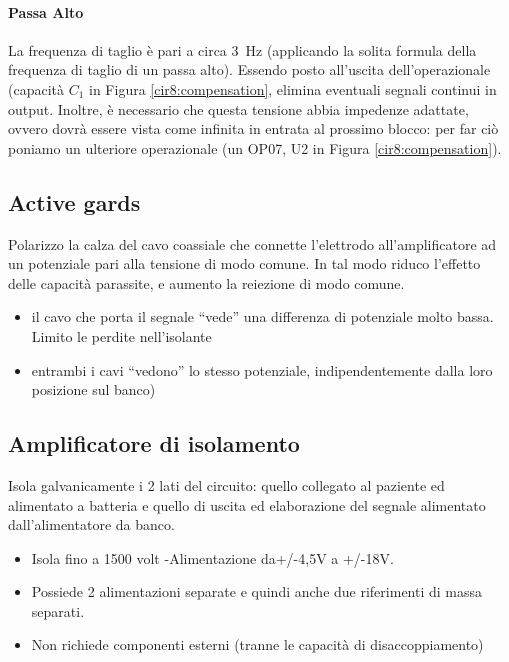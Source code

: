 \paragraph{Passa Alto} La frequenza di taglio è pari a circa \SI{3}{\Hz} (applicando la solita formula della frequenza di taglio di un passa alto). Essendo posto all'uscita dell'operazionale (capacità $C_1$ in Figura \ref{cir8:compensation}, elimina eventuali segnali continui in output. Inoltre, è necessario che questa tensione abbia impedenze adattate, ovvero dovrà essere vista come infinita in entrata al prossimo blocco: per far ciò poniamo un ulteriore operazionale (un OP07, U2 in Figura \ref{cir8:compensation}).

\subsection{Active gards}
Polarizzo la calza del cavo coassiale che connette l’elettrodo all’amplificatore ad un
potenziale pari alla tensione di modo comune.
In tal modo riduco l’effetto delle capacità parassite, e aumento la reiezione di modo
comune.
\begin{itemize}
\item il cavo che porta il segnale “vede” una differenza di potenziale molto bassa. Limito le
perdite nell’isolante
\item entrambi i cavi “vedono” lo stesso potenziale, indipendentemente dalla loro posizione sul
banco)
\end{itemize}

\subsection{Amplificatore di isolamento}
Isola galvanicamente i 2 lati del circuito: quello collegato al paziente ed alimentato a batteria e quello di uscita ed elaborazione del segnale alimentato dall’alimentatore da
banco.
\begin{itemize}
	\item Isola fino a 1500 volt -Alimentazione da+/-4,5V a +/-18V.
	\item Possiede 2 alimentazioni separate e quindi anche due riferimenti di massa separati.
	\item Non richiede componenti esterni (tranne le capacità di disaccoppiamento)
\end{itemize}


